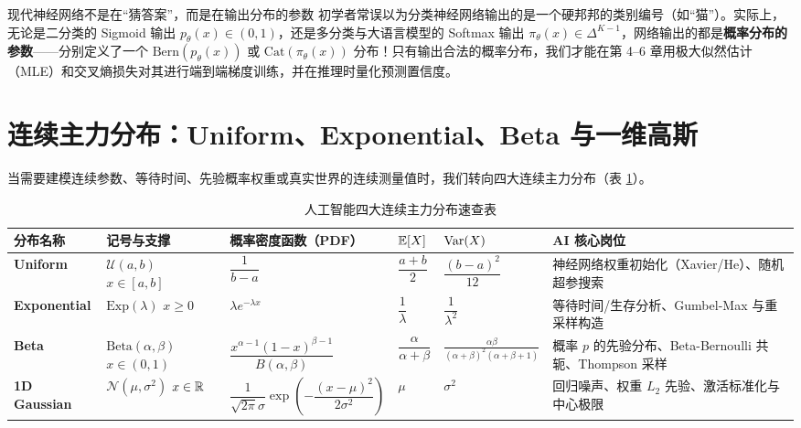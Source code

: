 \begin{insightBox}{现代神经网络不是在“猜答案”，而是在输出分布的参数}
初学者常误以为分类神经网络输出的是一个硬邦邦的类别编号（如“猫”）。实际上，无论是二分类的 Sigmoid 输出 $p_\theta(x) \in (0,1)$，还是多分类与大语言模型的 Softmax 输出 $\pi_\theta(x) \in \Delta^{K-1}$，网络输出的都是\textbf{概率分布的参数}——分别定义了一个 $\mathrm{Bern}(p_\theta(x))$ 或 $\mathrm{Cat}(\pi_\theta(x))$ 分布！只有输出合法的概率分布，我们才能在第 4--6 章用极大似然估计（MLE）和交叉熵损失对其进行端到端梯度训练，并在推理时量化预测置信度。
\end{insightBox}

\section{连续主力分布：Uniform、Exponential、Beta 与一维高斯}
\label{sec:ch2-continuous}

当需要建模连续参数、等待时间、先验概率权重或真实世界的连续测量值时，我们转向四大连续主力分布（表 \ref{tab:ch2-continuous}）。

\begin{table}[htbp]
  \centering
  \caption{人工智能四大连续主力分布速查表}
  \label{tab:ch2-continuous}
  \footnotesize
  \begin{tabularx}{\linewidth}{@{}p{21mm}p{19mm}p{33mm}p{14mm}p{26mm}X@{}}
    \toprule
    \textbf{分布名称} & \textbf{记号与支撑} & \textbf{概率密度函数（PDF）} & $\mathbb{E}[X]$ & $\operatorname{Var}(X)$ & \textbf{AI 核心岗位} \\
    \midrule
    \textbf{Uniform} & $\mathcal{U}(a,b)$ $x\in[a,b]$ & $\dfrac{1}{b-a}$ & $\dfrac{a+b}{2}$ & $\dfrac{(b-a)^2}{12}$ & 神经网络权重初始化（Xavier/He）、随机超参搜索 \\
    \textbf{Exponential} & $\mathrm{Exp}(\lambda)$ $x\ge 0$ & $\lambda e^{-\lambda x}$ & $\dfrac{1}{\lambda}$ & $\dfrac{1}{\lambda^2}$ & 等待时间/生存分析、Gumbel-Max 与重采样构造 \\
    \textbf{Beta} & $\mathrm{Beta}(\alpha,\beta)$ $x\in(0,1)$ & $\dfrac{x^{\alpha-1}(1-x)^{\beta-1}}{B(\alpha,\beta)}$ & $\dfrac{\alpha}{\alpha+\beta}$ & $\frac{\alpha\beta}{(\alpha+\beta)^2(\alpha+\beta+1)}$ & 概率 $p$ 的先验分布、Beta-Bernoulli 共轭、Thompson 采样 \\
    \textbf{1D Gaussian} & $\mathcal{N}(\mu,\sigma^2)$ $x\in\mathbb{R}$ & $\dfrac{1}{\sqrt{2\pi}\sigma}\exp\!\left(-\dfrac{(x-\mu)^2}{2\sigma^2}\right)$ & $\mu$ & $\sigma^2$ & 回归噪声、权重 $L_2$ 先验、激活标准化与中心极限 \\
    \bottomrule
  \end{tabularx}
\end{table}


